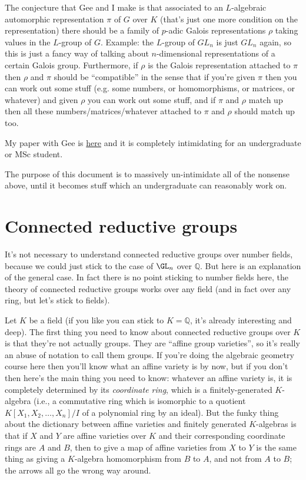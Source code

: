 \documentclass{amsart}
\newcommand{\Q}{\mathbb{Q}}
\begin{document}
The conjecture that Gee and I make is that associated to an $L$-algebraic automorphic representation $\pi$ of $G$ over $K$ (that's just one more condition on the representation) there should be a family of $p$-adic Galois representations $\rho$ taking values in the $L$-group of $G$. Example: the $L$-group of $GL_n$ is just $GL_n$ again, so this is just a fancy way of talking about $n$-dimensional representations of a certain Galois group. Furthermore, if $\rho$ is the Galois representation attached to $\pi$ then $\rho$ and $\pi$ should be ``compatible'' in the sense that if you're given $\pi$ then you can work out some stuff (e.g. some numbers, or homomorphisms, or matrices, or whatever) and given $\rho$ you can work out some stuff, and if $\pi$ and $\rho$ match up then all these numbers/matrices/whatever attached to $\pi$ and $\rho$ should match up too.

My paper with Gee is \href{https://arxiv.org/abs/1009.0785}{here} and it is completely intimidating for an undergraduate or MSc student.

The purpose of this document is to massively un-intimidate all of the nonsense above, until it becomes stuff which an undergraduate can reasonably work on.

\section{Connected reductive groups}

It's not necessary to understand connected reductive groups over number fields, because we could just stick to the case of $\GL_n$ over $\Q$. But here is an explanation of the general case. In fact there is no point sticking to number fields here, the theory of connected reductive groups works over any field (and in fact over any ring, but let's stick to fields).

Let $K$ be a field (if you like you can stick to $K=\Q$, it's already interesting and deep). The first thing you need to know about connected reductive groups over $K$ is that they're not actually groups. They are ``affine group varieties'', so it's really an abuse of notation to call them groups. If you're doing the algebraic geometry course here then you'll know what an affine variety is by now, but if you don't then here's the main thing you need to know: whatever an affine variety is, it is completely determined by its \emph{coordinate ring}, which is a finitely-generated $K$-algebra (i.e., a commutative ring which is isomorphic to a quotient $K[X_1,X_2,\ldots,X_n]/I$ of a polynomial ring by an ideal). But the funky thing about the dictionary between affine varieties and finitely generated $K$-algebras is that if $X$ and $Y$ are affine varieties over $K$ and their corresponding coordinate rings are $A$ and $B$, then to give a map of affine varieties from $X$ to $Y$ is the same thing as giving a $K$-algebra homomorphism from $B$ to $A$, and not from $A$ to $B$; the arrows all go the wrong way around.
\end{document}
